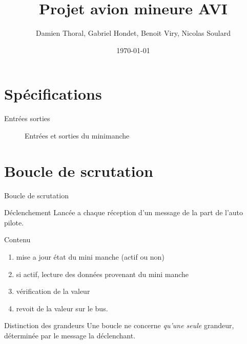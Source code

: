 \documentclass[footheight=2em]{beamer}
\title{Projet avion mineure AVI}
\author{Damien Thoral, Gabriel Hondet, Benoit Viry, Nicolas Soulard}
\date{\today}
\begin{document}
\frame{\titlepage}


\section{Spécifications}
\begin{frame}[t]{Entrées sorties}
  \begin{scriptsize}
    \begin{figure}
      \centering
      \caption{Entrées et sorties du minimanche}
      \label{fig:io}
    \end{figure}
  \end{scriptsize}
\end{frame}

\section{Boucle de scrutation}
\begin{frame}[t]{Boucle de scrutation}
  \begin{block}{Déclenchement}
    Lancée a chaque réception d'un message de la part de l'auto pilote.
  \end{block}

  \begin{block}{Contenu}
    \begin{enumerate}
      \item mise a jour état du mini manche (actif ou non)
      \item si actif, lecture des données provenant du mini manche
      \item vérification de la valeur
      \item revoit de la valeur sur le bus.
    \end{enumerate}
  \end{block}

  \begin{block}{Distinction des grandeurs}
    Une boucle ne concerne \emph{qu'une seule} grandeur, déterminée par le
    message la déclenchant.
  \end{block}
\end{frame}
\end{document}
